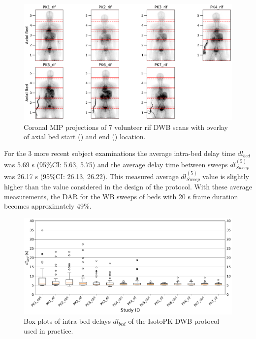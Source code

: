 %
\begin{figure} [ht!]
\centering
\includegraphics[scale=0.5,angle=0]{3_Results/3_1_DWB_Optimization/figures/3_1_MIPS_rif.pdf}
\caption{Coronal MIP projections of 7 volunteer rif DWB scans with overlay of axial bed start (\protect{}) and end (\protect{}) location.} 
\label{fig3_1:rif_mips}
\end{figure}
%
For the 3 more recent subject examinations the average intra-bed delay time ${dl_{bed}}$ was 5.69 s (95\%CI: 5.63, 5.75) and the average delay time between sweeps $dl_{Sweep}^{(5)}$ was 26.17 s (95\%CI: 26.13, 26.22).
This measured average $dl_{Sweep}^{(5)}$ value is slightly higher than the value considered in the design of the protocol. With these average measurements, the DAR for the WB sweeps of beds with 20 s frame duration becomes approximately 49\%. \\
%
\begin{figure} [ht!]
\centering
\includegraphics[scale=0.5,angle=0]{3_Results/3_1_DWB_Optimization/figures/3_1_BoxPlots_DTBeds.pdf}
\caption{Box plots of intra-bed delays $dl_{bed}$ of the IsotoPK DWB protocol used in practice.} 
\label{fig3_1:BoxPlots_beds}
\end{figure}
